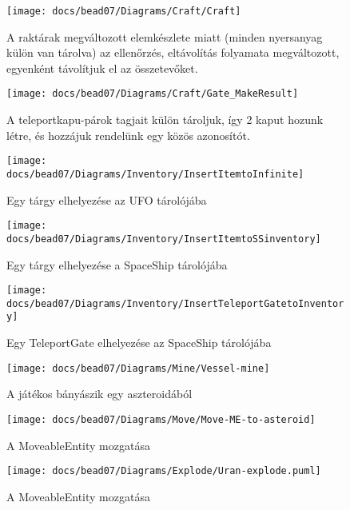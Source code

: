 \documentclass[../../projlab]{subfiles}
\begin{document}
\begin{figure}[H] 
    \centering 
    \texttt{[image: docs/bead07/Diagrams/Craft/Craft]} 
    \caption{A raktárak megváltozott elemkészlete miatt (minden nyersanyag külön van tárolva) az ellenőrzés, eltávolítás folyamata megváltozott, egyenként távolítjuk el az összetevőket. } 
\end{figure} 

\begin{figure}[H] 
    \centering 
    \texttt{[image: docs/bead07/Diagrams/Craft/Gate\_MakeResult]} 
    \caption{A teleportkapu-párok tagjait külön tároljuk, így 2 kaput hozunk létre, és hozzájuk rendelünk egy közös azonosítót.} 
\end{figure} 

\begin{figure}[H] 
    \centering 
    \texttt{[image: docs/bead07/Diagrams/Inventory/InsertItemtoInfinite]} 
    \caption{Egy tárgy elhelyezése az UFO tárolójába} 
\end{figure} 

\begin{figure}[H] 
    \centering 
    \texttt{[image: docs/bead07/Diagrams/Inventory/InsertItemtoSSinventory]} 
    \caption{Egy tárgy elhelyezése a SpaceShip tárolójába} 
\end{figure} 

\begin{figure}[H] 
    \centering 
    \texttt{[image: docs/bead07/Diagrams/Inventory/InsertTeleportGatetoInventory]} 
    \caption{Egy TeleportGate elhelyezése az SpaceShip tárolójába} 
\end{figure}

\begin{figure}[H] 
    \centering 
    \texttt{[image: docs/bead07/Diagrams/Mine/Vessel-mine]} 
    \caption{A játékos bányászik egy aszteroidából} 
\end{figure} 

\begin{figure}[H] 
    \centering 
    \texttt{[image: docs/bead07/Diagrams/Move/Move-ME-to-asteroid]} 
    \caption{A MoveableEntity mozgatása} 
\end{figure} 

\begin{figure}[H] 
    \centering 
    \texttt{[image: docs/bead07/Diagrams/Explode/Uran-explode.puml]} 
    \caption{A MoveableEntity mozgatása} 
\end{figure} 
\end{document}
